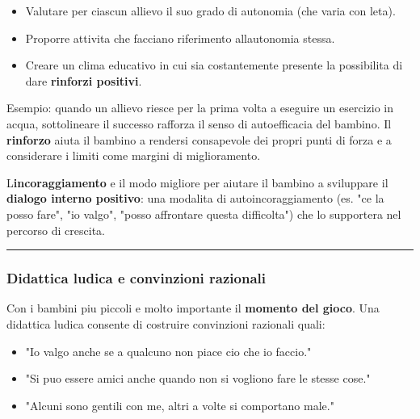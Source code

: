 \documentclass[a4paper,11pt]{article}
\providecommand{\tightlist}{%
  \setlength{\itemsep}{0pt}\setlength{\parskip}{0pt}}
\begin{document}
\begin{itemize}
      \tightlist
      \item
            Valutare per ciascun allievo il suo grado di autonomia (che varia con
            l\textquotesingle eta).
      \item
            Proporre attivita che facciano riferimento
            all\textquotesingle autonomia stessa.
      \item
            Creare un clima educativo in cui sia costantemente presente la
            possibilita di dare \textbf{rinforzi positivi}.
\end{itemize}

Esempio: quando un allievo riesce per la prima volta a eseguire un
esercizio in acqua, sottolineare il successo rafforza il senso di
autoefficacia del bambino. Il \textbf{rinforzo} aiuta il bambino a
rendersi consapevole dei propri punti di forza e a considerare i limiti
come margini di miglioramento.

L\textquotesingle{}\textbf{incoraggiamento} e il modo migliore per
aiutare il bambino a sviluppare il \textbf{dialogo interno positivo}:
una modalita di autoincoraggiamento (es. "ce la posso fare", "io valgo",
"posso affrontare questa difficolta") che lo supportera nel percorso di
crescita.

\begin{center}\rule{0.5\linewidth}{0.5pt}\end{center}

\subsubsection{Didattica ludica e convinzioni
      razionali}\label{didattica-ludica-e-convinzioni-razionali}

Con i bambini piu piccoli e molto importante il \textbf{momento del
      gioco}. Una didattica ludica consente di costruire convinzioni razionali
quali:

\begin{itemize}
      \tightlist
      \item
            "Io valgo anche se a qualcuno non piace cio che io faccio."
      \item
            "Si puo essere amici anche quando non si vogliono fare le stesse
            cose."
      \item
            "Alcuni sono gentili con me, altri a volte si comportano male."
\end{itemize}
\end{document}
